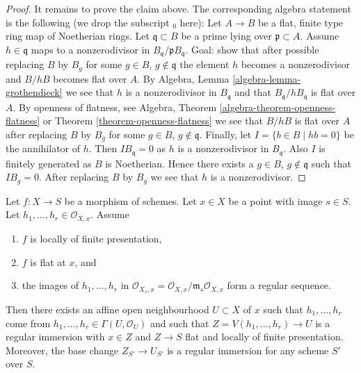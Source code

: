 \begin{proof}
\medskip\noindent
It remains to prove the claim above. The corresponding algebra statement
is the following (we drop the subscript ${}_0$ here):
Let $A \to B$ be a flat, finite type ring map of Noetherian rings.
Let $\mathfrak q \subset B$ be a prime lying over $\mathfrak p \subset A$.
Assume $h \in \mathfrak q$ maps to a nonzerodivisor in
$B_{\mathfrak q}/\mathfrak p B_{\mathfrak q}$.
Goal: show that after possible replacing $B$ by $B_g$ for some
$g \in B$, $g \not \in \mathfrak q$ the element $h$ becomes a nonzerodivisor
and $B/hB$ becomes flat over $A$. By
Algebra, Lemma \ref{algebra-lemma-grothendieck}
we see that $h$ is a nonzerodivisor in $B_{\mathfrak q}$ and that
$B_{\mathfrak q}/hB_{\mathfrak q}$ is flat over $A$.
By openness of flatness, see
Algebra, Theorem \ref{algebra-theorem-openness-flatness}
or
Theorem \ref{theorem-openness-flatness}
we see that $B/hB$ is flat over $A$ after replacing $B$ by $B_g$ for some
$g \in B$, $g \not \in \mathfrak q$. Finally, let
$I = \{b \in B \mid hb = 0\}$ be the annihilator of $h$. Then
$IB_{\mathfrak q} = 0$ as $h$ is a nonzerodivisor in $B_{\mathfrak q}$.
Also $I$ is finitely generated as $B$ is Noetherian.
Hence there exists a $g \in B$, $g \not \in \mathfrak q$ such that $IB_g = 0$.
After replacing $B$ by $B_g$ we see that $h$ is a nonzerodivisor.
\end{proof}

\begin{lemma}
\label{lemma-slice-given-elements}
Let $f : X \to S$ be a morphism of schemes.
Let $x \in X$ be a point with image $s \in S$.
Let $h_1, \ldots, h_r \in \mathcal{O}_{X, x}$.
Assume
\begin{enumerate}
\item $f$ is locally of finite presentation,
\item $f$ is flat at $x$, and
\item the images of $h_1, \ldots, h_r$ in
$\mathcal{O}_{X_s, x} = \mathcal{O}_{X, x}/\mathfrak m_s\mathcal{O}_{X, x}$
form a regular sequence.
\end{enumerate}
Then there exists an affine open neighbourhood $U \subset X$ of $x$
such that $h_1, \ldots, h_r$ come from
$h_1, \ldots, h_r \in \Gamma(U, \mathcal{O}_U)$ and such
that $Z = V(h_1, \ldots, h_r) \to U$ is a regular immersion with
$x \in Z$ and $Z \to S$ flat and locally of finite presentation.
Moreover, the base change $Z_{S'} \to U_{S'}$ is a regular immersion
for any scheme $S'$ over $S$.
\end{lemma}

